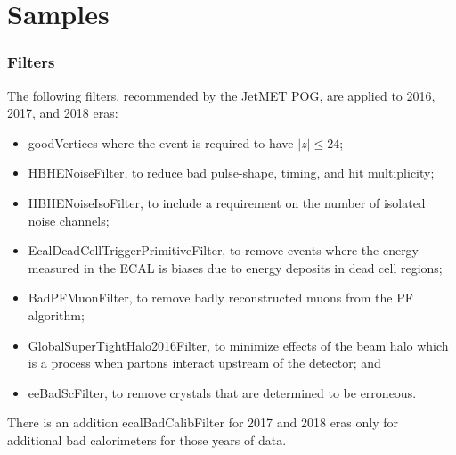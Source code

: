 \chapter{Samples}\label{sec:SamplesApp}


\subsection{Filters}
The following filters, recommended by the JetMET POG, are applied to 2016, 2017, and 2018 eras:
\begin{itemize}
	\item goodVertices where the event is required to have $|z|\leq24$;
	\item HBHENoiseFilter, to reduce bad pulse-shape, timing, and hit multiplicity;
	\item HBHENoiseIsoFilter, to include a requirement on the number of isolated noise channels;
	\item EcalDeadCellTriggerPrimitiveFilter, to remove events where the energy measured in the ECAL is biases due to energy deposits in dead cell regions;
	\item BadPFMuonFilter, to remove badly reconstructed muons from the PF algorithm;
	\item GlobalSuperTightHalo2016Filter, to minimize effects of the beam halo which is a process when partons interact upstream of the detector; and
	\item eeBadScFilter, to remove crystals that are determined to be erroneous.
\end{itemize}
There is an addition ecalBadCalibFilter for 2017 and 2018 eras only for additional bad calorimeters for those years of data.

